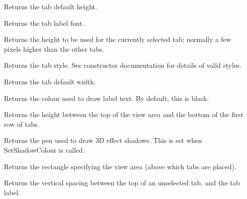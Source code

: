 Returns the tab default height.



Returns the tab label font.



Returns the height to be used for the currently selected tab; normally a few pixels
higher than the other tabs.



Returns the tab style. See constructor documentation for details of valid styles.



Returns the tab default width.



Returns the colour used to draw label text. By default, this is
black.



Returns the height between the top of the view area and the bottom of the first
row of tabs.



Returns the pen used to draw 3D effect shadows. This is set when
SetShadowColour is called. 



Returns the rectangle specifying the view area (above which tabs are
placed).



Returns the vertical spacing between the top of an unselected tab, and the tab label.


